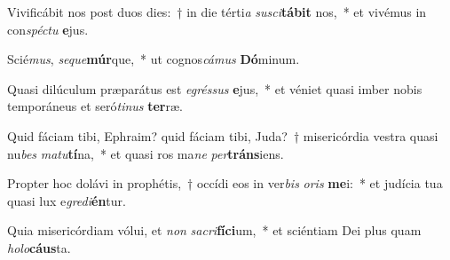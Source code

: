 \item Vivificábit nos post duos dies:~† in die térti\textit{a} \textit{su}\textit{sci}\textbf{tá}\textbf{bit} nos,~* et vivémus in con\textit{spéc}\textit{tu} \textbf{e}jus.
\item Scié\textit{mus}, \textit{se}\textit{que}\textbf{múr}que,~* ut cognos\textit{cá}\textit{mus} \textbf{Dó}minum.
\item Quasi dilúculum præparátus est \textit{e}\textit{grés}\textit{sus} \textbf{e}jus,~* et véniet quasi imber nobis temporáneus et seró\textit{ti}\textit{nus} \textbf{ter}ræ.
\item Quid fáciam tibi, Ephraim? quid fáciam tibi, Juda?~† misericórdia vestra quasi nu\textit{bes} \textit{ma}\textit{tu}\textbf{tí}na,~* et quasi ros ma\textit{ne} \textit{per}\textbf{tráns}iens.
\item Propter hoc dolávi in prophétis,~† occídi eos in ver\textit{bis} \textit{o}\textit{ris} \textbf{me}i:~* et judícia tua quasi lux e\textit{gre}\textit{di}\textbf{én}tur.
\item Quia misericórdiam vólui, et \textit{non} \textit{sa}\textit{cri}\textbf{fí}\textbf{ci}um,~* et sciéntiam Dei plus quam \textit{ho}\textit{lo}\textbf{cáus}ta.
